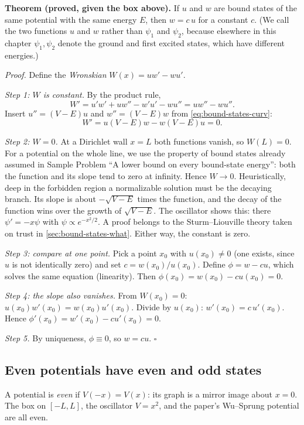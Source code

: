 \textbf{Theorem (proved, given the box above).} If $u$ and $w$ are bound states of the same potential with the same energy $E$, then $w=c\,u$ for a constant $c$. (We call the two functions $u$ and $w$ rather than $\psi_1$ and $\psi_2$, because elsewhere in this chapter $\psi_1,\psi_2$ denote the ground and first excited states, which have different energies.)

\emph{Proof.} Define the \emph{Wronskian} $W(x)=uw'-wu'$.

\emph{Step 1: $W$ is constant.} By the product rule,
\[
W'=u'w'+uw''-w'u'-wu''=uw''-wu'' .
\]
Insert $u''=(V-E)u$ and $w''=(V-E)w$ from \cref{eq:bound-states-curv}:
\[
W'=u(V-E)w-w(V-E)u=0 .
\]

\emph{Step 2: $W=0$.} At a Dirichlet wall $x=L$ both functions vanish, so $W(L)=0$. For a potential on the whole line, we use the property of bound states already assumed in Sample Problem ``A lower bound on every bound-state energy'': both the function and its slope tend to zero at infinity. Hence $W\to0$. Heuristically, deep in the forbidden region a normalizable solution must be the decaying branch. Its slope is about $-\sqrt{V-E}$ times the function, and the decay of the function wins over the growth of $\sqrt{V-E}$. The oscillator shows this: there $\psi'=-x\psi$ with $\psi\propto e^{-x^2/2}$. A proof belongs to the Sturm--Liouville theory taken on trust in \cref{sec:bound-states-what}. Either way, the constant is zero.

\emph{Step 3: compare at one point.} Pick a point $x_0$ with $u(x_0)\ne0$ (one exists, since $u$ is not identically zero) and set $c=w(x_0)/u(x_0)$. Define $\phi=w-cu$, which solves the same equation (linearity). Then $\phi(x_0)=w(x_0)-cu(x_0)=0$.

\emph{Step 4: the slope also vanishes.} From $W(x_0)=0$: $u(x_0)w'(x_0)=w(x_0)u'(x_0)$. Divide by $u(x_0)$: $w'(x_0)=c\,u'(x_0)$. Hence $\phi'(x_0)=w'(x_0)-cu'(x_0)=0$.

\emph{Step 5.} By uniqueness, $\phi\equiv0$, so $w=cu$. $\square$

\subsection{Even potentials have even and odd states}

A potential is \emph{even} if $V(-x)=V(x)$: its graph is a mirror image about $x=0$. The box on $[-L,L]$, the oscillator $V=x^2$, and the paper's Wu--Sprung potential are all even.

